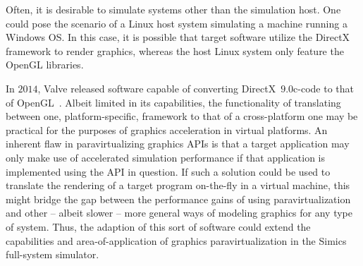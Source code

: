 Often, it is desirable to simulate systems other than the simulation host.
One could pose the scenario of a Linux host system simulating a machine running a Windows OS.
In this case, it is possible that target software utilize the DirectX framework to render graphics, whereas the host Linux system only feature the OpenGL libraries.

In $2014$, Valve released software capable of converting DirectX~$9.0$c-code to that of OpenGL~.
Albeit limited in its capabilities, the functionality of translating between one, platform-specific, framework to that of a cross-platform one may be practical for the purposes of graphics acceleration in virtual platforms.
An inherent flaw in paravirtualizing graphics APIs is that a target application may only make use of accelerated simulation performance if that application is implemented using the API in question.
If such a solution could be used to translate the rendering of a target program on-the-fly in a virtual machine, this might bridge the gap between the performance gains of using paravirtualization and other -- albeit slower -- more general ways of modeling graphics for any type of system.
Thus, the adaption of this sort of software could extend the capabilities and area-of-application of graphics paravirtualization in the Simics full-system simulator.


